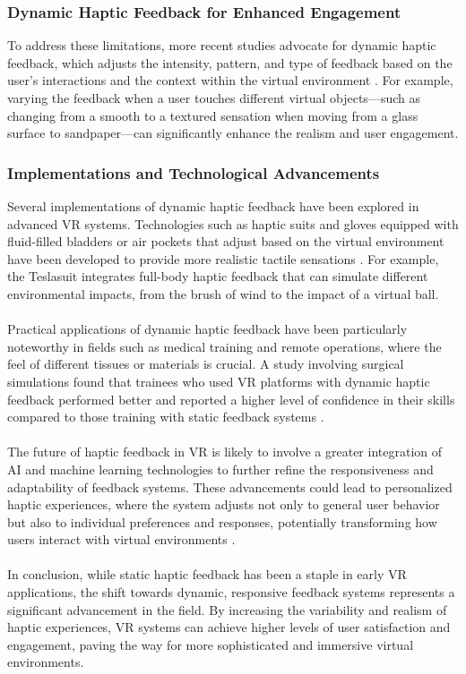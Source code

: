 \subsubsection{Dynamic Haptic Feedback for Enhanced Engagement}
To address these limitations, more recent studies advocate for dynamic haptic feedback, which adjusts the intensity, pattern, and type of feedback based on the user's interactions and the context within the virtual environment \cite{mcneill2009gesture}. For example, varying the feedback when a user touches different virtual objects—such as changing from a smooth to a textured sensation when moving from a glass surface to sandpaper—can significantly enhance the realism and user engagement.
\subsubsection{Implementations and Technological Advancements}
Several implementations of dynamic haptic feedback have been explored in advanced \ac{VR} systems. Technologies such as haptic suits and gloves equipped with fluid-filled bladders or air pockets that adjust based on the virtual environment have been developed to provide more realistic tactile sensations \cite{stanney2019handbook}. For example, the Teslasuit integrates full-body haptic feedback that can simulate different environmental impacts, from the brush of wind to the impact of a virtual ball.\\ \\
Practical applications of dynamic haptic feedback have been particularly noteworthy in fields such as medical training and remote operations, where the feel of different tissues or materials is crucial. A study involving surgical simulations found that trainees who used \ac{VR} platforms with dynamic haptic feedback performed better and reported a higher level of confidence in their skills compared to those training with static feedback systems \cite{zhang2017deep}.\\ \\
The future of haptic feedback in \ac{VR} is likely to involve a greater integration of AI and machine learning technologies to further refine the responsiveness and adaptability of feedback systems. These advancements could lead to personalized haptic experiences, where the system adjusts not only to general user behavior but also to individual preferences and responses, potentially transforming how users interact with virtual environments \cite{wickens2015engineering}.\\ \\
In conclusion, while static haptic feedback has been a staple in early \ac{VR} applications, the shift towards dynamic, responsive feedback systems represents a significant advancement in the field. By increasing the variability and realism of haptic experiences, \ac{VR} systems can achieve higher levels of user satisfaction and engagement, paving the way for more sophisticated and immersive virtual environments.

